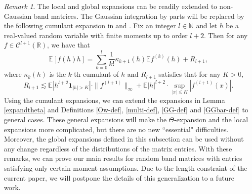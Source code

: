 \documentclass{article}
\newcommand{\1}{\mathds{1}}
\numberwithin{equation}{section}
\renewcommand{\cal}{\mathcal}
\renewcommand{\leq}{\leqslant}
\renewcommand{\le}{\leq}
\newcommand{\R}{\mathbb{R}}
\newcommand{\N}{\mathbb{N}}
\theoremstyle{plain} %
\theoremstyle{remark}
\newtheorem{remark}[theorem]{Remark}
\newcommand{\cor}{\color{red}}
\newcommand{\nc}{\normalcolor}
\newcommand{\hty}[1]{{\cor (ht: #1) }}
\begin{document}
% 
% 
% 
% 





 \begin{remark}\label{rem general distr}
The local and global expansions can be readily extended to non-Gaussian band matrices. %
The Gaussian integration by parts will be replaced by the following cumulant expansion in \cite[Proposition 3.1]{Cumulant1} and \cite[Section II]{Cumulant2}. Fix an integer  $l\in \N$ and let $h$ be a real-valued random variable with finite moments up to order $l+2$. Then for  any  $f\in \cal C^{l+1}(\R)$,  we have that
$$\mathbb E [f(h) h]=\sum_{k=0}^{l}\frac1{k!}\kappa_{k+1}(h)\mathbb Ef^{(k)}(h)+ R_{l+1},$$
where $\kappa_{k}(h)$ is the $k$-th cumulant of $h$ and $R_{l+1}$ satisfies that for any $K>0$,
$$R_{l+1}\lesssim \mathbb E\left| h^{l+2} \mathbf 1_{|h|>K}\right|\cdot \|f^{(l+1)}\|_{\infty} + \mathbb E\left| h\right|^{l+2}\cdot \sup_{|x|\le K}|f^{(l+1)}(x)|.$$
Using the cumulant expansions, we can extend the expansions in Lemma \ref{expandtheta} and Definitions \ref{Ow-def}, \ref{multi-def}, \ref{GG-def} and \ref{GGbar-def} to general cases. These general expansions will make the $\Theta$-expansion and the local expansions more complicated, but there are no new ``essential" difficulties. Moreover, the global expansions defined in this subsection can be %
used without any change regardless of the distributions of the matrix entries. With these remarks, we can prove our main results for random band matrices with entries satisfying only certain moment assumptions. Due to the length constraint of the current paper, we will postpone the details of this generalization  to a future work.
\end{remark}
\end{document}

